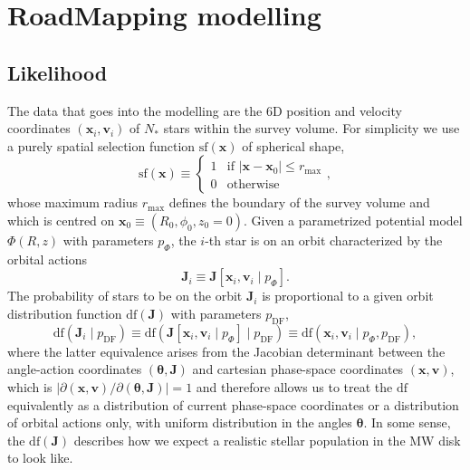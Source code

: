 \documentclass[iop,revtex4,numberedappendix,appendixfloats]{emulateapj}
\newcommand{\vect}[1]{\boldsymbol{#1}}
\begin{document}
\section{RoadMapping modelling} \label{sec:RoadMapping}

\subsection{Likelihood} \label{sec:likelihood}

The data that goes into the modelling are the 6D position and velocity coordinates $(\vect{x}_i,\vect{v}_i)$ of $N_*$ stars within the survey volume. For simplicity we use a purely spatial selection function $\text{sf}(\vect{x})$ of spherical shape,
\begin{equation*}
\text{sf}(\vect{x}) \equiv \begin{cases} 1 &\mbox{if } \left| \vect{x}-\vect{x}_0 \right| \leq r_\text{max} \\
0 & \mbox{otherwise} \end{cases},
\end{equation*}
whose maximum radius $r_\text{max}$ defines the boundary of the survey volume and which is centred on $\vect{x}_0 \equiv (R_0,\phi_0,z_0=0)$. Given a parametrized potential model $\Phi(R,z)$ with parameters $p_\Phi$, the $i$-th star is on an orbit characterized by the orbital actions 
\begin{equation*}
\vect{J}_i \equiv \vect{J}[\vect{x}_i,\vect{v}_i \mid p_\Phi].
\end{equation*}
The probability of stars to be on the orbit $\vect{J}_i$ is proportional to a given orbit distribution function $\text{df}(\vect{J})$ with parameters $p_\text{DF}$,
\begin{equation*}
\text{df}(\vect{J}_i \mid p_\text{DF}) \equiv \text{df}(\vect{J}[\vect{x}_i,\vect{v}_i \mid p_\Phi] \mid p_\text{DF}) \equiv \text{df}(\vect{x}_i,\vect{v}_i \mid p_\Phi,p_\text{DF}),
\end{equation*} 
where the latter equivalence arises from the Jacobian determinant between the angle-action coordinates $(\vect{\theta},\vect{J})$ and cartesian phase-space coordinates $(\vect{x},\vect{v})$, which is $\left| \partial (\vect{x},\vect{v}) / \partial(\vect{\theta},\vect{J})\right|=1$ and therefore allows us to treat the $\text{df}$ equivalently as a distribution of current phase-space coordinates or a distribution of orbital actions only, with uniform distribution in the angles $\vect{\theta}$. In some sense, the $\text{df}(\vect{J})$ describes how we expect a realistic stellar population in the MW disk to look like.
\end{document}
